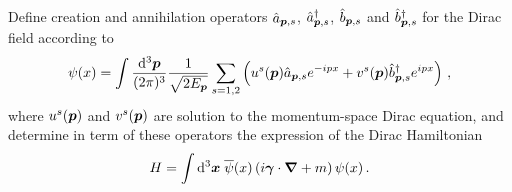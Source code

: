 \begin{ex} \label{ex_20} 
    Define creation and annihilation operators $\hat{a}_{\boldsymbol{p}, s}$, $\hat{a}^\dagger_{\boldsymbol{p}, s}$, $\hat{b}_{\boldsymbol{p}, s}$ and $\hat{b}^\dagger_{\boldsymbol{p}, s}$ for the Dirac field according to
    \begin{equation} \label{Eq_Ex20_fermion_field_def}
        \psi(x) = \int \frac{{\rm d}^3 \boldsymbol{p}}{(2\pi)^3} \frac{1}{\sqrt{2 E_{\boldsymbol{p}}}} \sum_{s=1,2} \left( u^s(\boldsymbol{p}) \hat{a}_{\boldsymbol{p}, s}e^{-ipx} + v^s(\boldsymbol{p}) \hat{b}^\dagger_{\boldsymbol{p}, s}e^{ipx}\right)\,,
    \end{equation}
    where $u^s(\boldsymbol{p})$ and $v^s(\boldsymbol{p})$ are solution to the momentum-space Dirac equation, and determine in term of these operators the expression of the Dirac Hamiltonian
    \begin{equation}
        H = \int {\rm d}^3 \boldsymbol{x} \; \overline{\psi}(x)\left( i \boldsymbol{\gamma} \cdot \boldsymbol{\nabla} +m\right) \psi(x) \,.
    \end{equation}
\end{ex}


